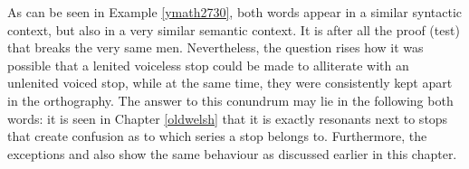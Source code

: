 As can be seen in Example \ref{ymath2730}, both words appear in a similar syntactic context, but also in a very similar semantic context. It is after all the proof (\ie test) that breaks the very same men. Nevertheless, the question rises how it was possible that a lenited voiceless stop could be made to alliterate with an unlenited voiced stop, while at the same time, they were consistently kept apart in the orthography. The answer to this conundrum may lie in the  following both words: it is seen in Chapter \ref{oldwelsh} that it is exactly resonants next to stops that create confusion as to which series a stop belongs to. Furthermore, the exceptions  and  also show the same behaviour as  discussed earlier in this chapter.
